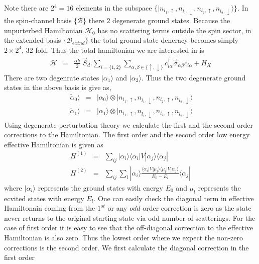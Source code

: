\documentclass[reprint,prb,superscriptaddress]{revtex4-1}
\begin{document}
Note there are $2^4=16$ elements in the subspace $\{|n_{l_1,\uparrow},n_{l_1,\downarrow},n_{l_2,\uparrow},n_{l_2,\downarrow}\rangle\}$. In the spin-channel basis $\{\mathcal{B}\}$ there $2$ degenerate ground states. Because the unpurterbed Hamiltonian $\mathcal{H}_0$ has no scattering terms outside the spin sector, in the extended basis $\{\mathcal{B}_{extnd}\}$ the total ground state deneracy becomes simply $2\times 2^4$, $32$ fold. Thus the total hamiltonian we are interested in is 
\begin{eqnarray}
\mathcal{H} &=& \frac{\alpha\hbar}{2}~ \vec{S}_d. \displaystyle\sum_{i=\{1,2\}} \displaystyle\sum_{\alpha,\beta\in\{\uparrow,\downarrow\}}c_{i\alpha}^{\dagger} \vec{\sigma}_{\alpha\beta} c_{i\alpha} +H_X
\end{eqnarray}
There are two degenrate states $|\alpha_1\rangle$ and $|\alpha_2\rangle$. Thus the two degenerate ground states in the above basis is give as,
\begin{eqnarray}
|\tilde{\alpha}_0\rangle &=&| {\alpha}_0\rangle\otimes |n_{l_1,\uparrow},n_{l_1,\downarrow},n_{l_2,\uparrow},n_{l_2,\downarrow}\rangle \\
|\tilde{\alpha}_1\rangle &=& | {\alpha}_1\rangle\otimes |n_{l_1,\uparrow},n_{l_1,\downarrow},n_{l_2,\uparrow},n_{l_2,\downarrow}\rangle
\end{eqnarray}
Using degenerate perturbation theory we calculate the first and the second order corrections to the Hamiltonian. The first order and the second order low energy effective Hamiltonian is given as 
\begin{eqnarray}
H^{(1)} &=& \sum_{ij} |\alpha_i\rangle \langle \alpha_i  | V| \alpha_j \rangle \langle \alpha_j |~\nonumber\\
H^{(2)} &=& \sum_{ij} \sum_l |\alpha_i\rangle \frac{\langle \alpha_i  | V| \mu_l \rangle \langle \mu_l  | V| \alpha_j \rangle}{E_0-E_{l}}\langle \alpha_j |
\end{eqnarray}
where $|\alpha_i\rangle$ represents the ground states with energy $E_0$ and $\mu_l$ represents the ecvited states with energy $E_l$. One can easily check the diagonal term in effective Hamiltonain coming from the $1^{st}$ or any $odd$ order correction is zero as the state never returns to the original starting state via odd number of scatterings. For the case of first order it is easy to see that the off-diagonal correction to the effective Hamiltonian is also zero. Thus the lowest order where we expect the non-zero corrections is the second order. We first calculate the diagonal correction in the first order
\end{document}
